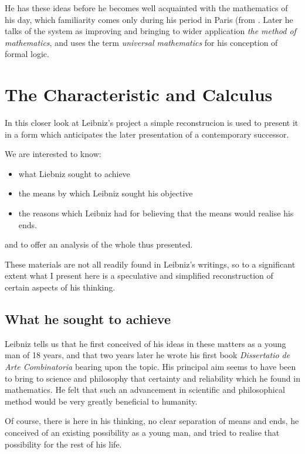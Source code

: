 He has these ideas before he becomes well acquainted with the mathematics of his day,
which familiarity comes only during his period in Paris (from .
Later he talks of the system as improving and bringing to wider application \emph{the method of mathematics},
and uses the term \emph{universal mathematics} for his conception of formal logic.

\section{The Characteristic and Calculus}

In this closer look at Leibniz's project a simple reconstrucion is used to present
it in a form which anticipates the later presentation of a contemporary successor.

We are interested to know:

\begin{itemize}
\item what Liebniz sought to achieve
\item the means by which Leibniz sought his objective
\item the reasons which Leibniz had for believing that the means would realise his ends.
\end{itemize}

and to offer an analysis of the whole thus presented.

These materials are not all readily found in Leibniz's writings, so to a significant
extent what I present here is a speculative and simplified reconstruction of certain
aspects of his thinking.

\subsection{What he sought to achieve}

Leibniz tells us that he first conceived of his ideas in these matters as a young man
of 18 years, and that two years later he wrote his first book \emph{Dissertatio de Arte Combinatoria}\cite{leibniz66}
bearing upon the topic.
His principal aim seems to have been to bring to science and philosophy that certainty and
reliability which he found in mathematics.
He felt that such an advancement in scientific and philosophical method would be very greatly
beneficial to humanity.

Of course, there is here in his thinking, no clear separation of means and ends,
he conceived of an existing possibility as a young man, and tried to realise that
possibility for the rest of his life.

